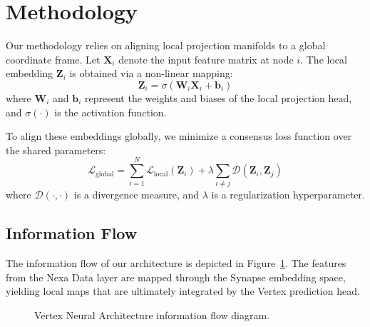 \section{Methodology}
\label{sec:methodology}

Our methodology relies on aligning local projection manifolds to a global coordinate frame. Let $\mathbf{X}_i$ denote the input feature matrix at node $i$. The local embedding $\mathbf{Z}_i$ is obtained via a non-linear mapping:
\begin{equation}
\mathbf{Z}_i = \sigma(\mathbf{W}_i \mathbf{X}_i + \mathbf{b}_i)
\end{equation}
where $\mathbf{W}_i$ and $\mathbf{b}_i$ represent the weights and biases of the local projection head, and $\sigma(\cdot)$ is the activation function.

To align these embeddings globally, we minimize a consensus loss function over the shared parameters:
\begin{equation}
\mathcal{L}_{\text{global}} = \sum_{i=1}^{N} \mathcal{L}_{\text{local}}(\mathbf{Z}_i) + \lambda \sum_{i \neq j} \mathcal{D}(\mathbf{Z}_i, \mathbf{Z}_j)
\end{equation}
where $\mathcal{D}(\cdot, \cdot)$ is a divergence measure, and $\lambda$ is a regularization hyperparameter.

\subsection{Information Flow}
The information flow of our architecture is depicted in Figure~\ref{fig:architecture}. The features from the Nexa Data layer are mapped through the Synapse embedding space, yielding local maps that are ultimately integrated by the Vertex prediction head.

\begin{figure}[htbp]
\centering
{}
\caption{Vertex Neural Architecture information flow diagram.}
\label{fig:architecture}
\end{figure}
